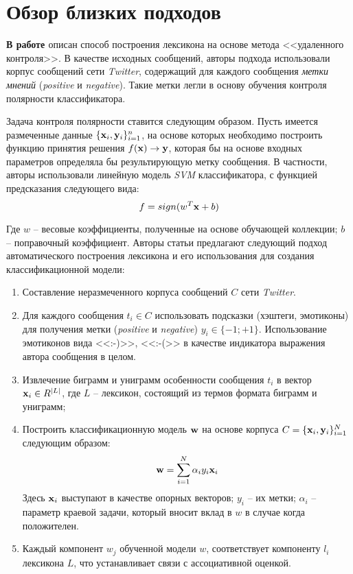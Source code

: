 \section{Обзор близких подходов}
    {\bf В работе \cite{severyn}} описан способ построения лексикона
    на основе метода <<удаленного контроля>>. В качестве исходных сообщений,
    авторы подхода использовали корпус сообщений сети {\it Twitter}, содержащий
    для каждого сообщения {\it метки мнений} ({\it positive} и {\it negative}).
    Такие метки легли в основу обучения контроля полярности классификатора.

    Задача контроля полярности ставится следующим образом. Пусть имеется
    размеченные данные $ \{{\bf x}_i, {\bf y}_i \}_{i=1}^{n}$, на основе
    которых необходимо построить функцию принятия решения
    $f({\bf x}) \to {\bf y}$, которая бы на основе входных параметров
    определяла бы результирующую метку сообщения.
    В частности, авторы использовали линейную модель {\it SVM} классификатора, с
    функцией предсказания следующего вида:
    \begin{equation}
        f = sign(w^T{\bf x} + b)
    \end{equation}

    Где $w$ -- весовые коэффициенты, полученные на основе обучающей коллекции;
    $b$ -- поправочный коэффициент.
    Авторы статьи предлагают следующий подход автоматического построения
    лексикона и его использования для создания классификационной модели:
    \begin{enumerate}
        \item Составление неразмеченного корпуса сообщений $C$ сети {\it Twitter}.
        \item Для каждого сообщения $t_i \in C$ использовать подсказки
            (хэштеги, эмотиконы) для получения метки ({\it positive} и {\it negative})
            $y_i \in \{-1; +1\}$. Использование эмотиконов вида <<:-)>>, <<:-(>>
            в качестве индикатора выражения автора сообщения в целом.
        \item Извлечение биграмм и униграмм особенности сообщения $t_i$ в
            вектор ${\bf x}_i \in R^{|L|}$, где $L$ -- лексикон, состоящий из
            термов формата биграмм и униграмм;
        \item Построить классификационную модель ${\bf w}$ на основе корпуса
            $C = \{{\bf x}_i, {\bf y}_i \}_{i=1}^{N}$ следующим образом:
        \begin{equation}
            {\bf w} = \sum\limits_{i=1}^{N}\alpha_i y_i {\bf x}_i
        \end{equation}
        Здесь ${\bf x}_i$ выступают в качестве опорных векторов; $y_i$ -- их метки;
        $\alpha_i$ -- параметр краевой задачи, который вносит вклад в
        $w$ в случае когда положителен.
        \item Каждый компонент $w_j$ обученной модели $w$, соответствует компоненту $l_i$
            лексикона $L$, что устанавливает связи с ассоциативной оценкой.
    \end{enumerate}

